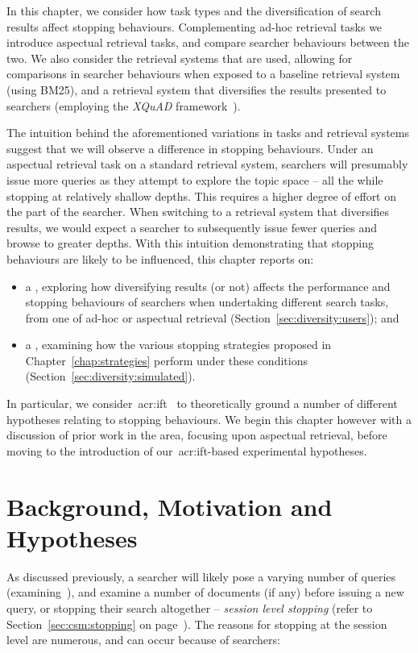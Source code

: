 In this chapter, we consider how task types and the diversification of search results affect stopping behaviours. Complementing ad-hoc retrieval tasks we introduce aspectual retrieval tasks, and compare searcher behaviours between the two. We also consider the retrieval systems that are used, allowing for comparisons in searcher behaviours when exposed to a baseline retrieval system (using BM25), and a retrieval system that diversifies the results presented to searchers (employing the \emph{XQuAD} framework~\citep{santos2010query_reformulations_diversification}).

The intuition behind the aforementioned variations in tasks and retrieval systems suggest that we will observe a difference in stopping behaviours. Under an aspectual retrieval task on a standard retrieval system, searchers will presumably issue more queries as they attempt to explore the topic space -- all the while stopping at relatively shallow depths. This requires a higher degree of effort on the part of the searcher. When switching to a retrieval system that diversifies results, we would expect a searcher to subsequently issue fewer queries and browse to greater depths. With this intuition demonstrating that stopping behaviours are likely to be influenced, this chapter reports on:

\begin{itemize}
    \item{a , exploring how diversifying results (or not) affects the performance and stopping behaviours of searchers when undertaking different search tasks, from one of ad-hoc or aspectual retrieval (Section~\ref{sec:diversity:users}); and}
    \item{a , examining how the various stopping strategies proposed in Chapter~\ref{chap:strategies} perform under these conditions (Section~\ref{sec:diversity:simulated}).}
\end{itemize}

In particular, we consider~\gls{acr:ift}~\citep{pirolli1999ift} to theoretically ground a number of different hypotheses relating to stopping behaviours. We begin this chapter however with a discussion of prior work in the area, focusing upon aspectual retrieval, before moving to the introduction of our~\gls{acr:ift}-based experimental hypotheses.

\section{Background, Motivation and Hypotheses}\label{sec:diversity:background}
As discussed previously, a searcher will likely pose a varying number of queries (examining~), and examine a number of documents (if any) before issuing a new query, or stopping their search altogether -- \emph{session level stopping} (refer to Section~\ref{sec:csm:stopping} on page~\pageref{sec:csm:stopping}). The reasons for stopping at the session level are numerous, and can occur because of searchers:

